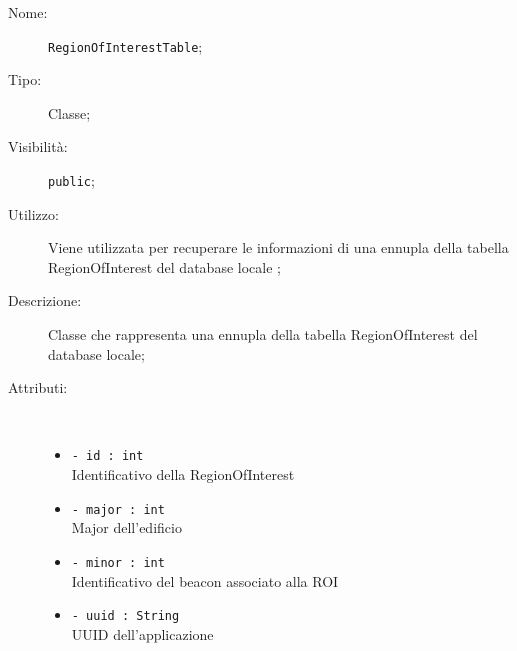 \documentclass[../DefinizioneDiProdotto.tex]{subfiles}
\begin{document}
\begin{description}
	\item[Nome:] \texttt{RegionOfInterestTable};
	\item[Tipo:] Classe;
	\item[Visibilità:] \texttt{public};
	\item[Utilizzo:] Viene utilizzata per recuperare le informazioni di una ennupla della tabella RegionOfInterest del database locale ;
	\item[Descrizione:] Classe che rappresenta una ennupla della tabella RegionOfInterest del database locale;
	\item[Attributi:] \
	\begin{itemize}
		\item \texttt{- id : int}\\
		Identificativo della RegionOfInterest
		
		\item \texttt{- major : int}\\
		Major dell'edificio
		
		\item \texttt{- minor : int}\\
		Identificativo del beacon associato alla ROI
		
		\item \texttt{- uuid : String}\\
		UUID dell'applicazione
		

\end{itemize}
\end{description}
\end{document}
